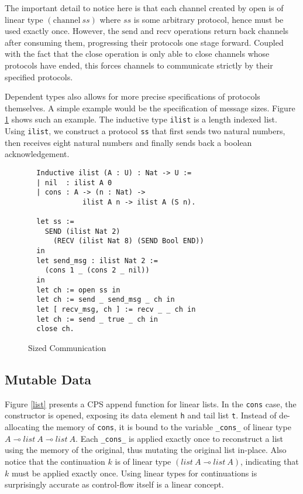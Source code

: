 \documentclass[sigplan,screen,review,authordraft]{acmart}
\newcommand{\channel}{\text{channel}}
\newcommand{\open}{\text{open}}
\newcommand{\close}{\text{close}}
\newcommand{\send}{\text{send}}
\newcommand{\recv}{\text{recv}}
\begin{document}
The important detail to notice here is that each channel created by $\open$ is of linear type $(\channel\ ss)$ where $ss$ is some arbitrary protocol, hence must be used exactly once. However, the $\send$ and $\recv$ operations return back channels after consuming them, progressing their protocols one stage forward. Coupled with the fact that the $\close$ operation is only able to close channels whose protocols have ended, this forces channels to communicate strictly by their specified protocols.

Dependent types also allows for more precise specifications of protocols themselves. A simple example would be the specification of message sizes. Figure \ref{communication} shows such an example. The inductive type \texttt{ilist} is a length indexed list. Using \texttt{ilist}, we construct a protocol \texttt{ss} that first sends two natural numbers, then receives eight natural numbers and finally sends back a boolean acknowledgement.

\begin{figure}[h]
  \caption{Sized Communication}
  \begin{verbatim}
  Inductive ilist (A : U) : Nat -> U :=
  | nil  : ilist A 0
  | cons : A -> (n : Nat) -> 
             ilist A n -> ilist A (S n).

  let ss := 
    SEND (ilist Nat 2) 
      (RECV (ilist Nat 8) (SEND Bool END)) 
  in
  let send_msg : ilist Nat 2 := 
    (cons 1 _ (cons 2 _ nil)) 
  in
  let ch := open ss in
  let ch := send _ send_msg _ ch in
  let [ recv_msg, ch ] := recv _ _ ch in
  let ch := send _ true _ ch in
  close ch.            
  \end{verbatim}
  \label{communication}
  \Description{}
\end{figure}

\subsection{Mutable Data}
Figure \ref{list} presents a CPS append function for linear lists. In the \texttt{cons} case, the constructor is opened, exposing its data element \texttt{h} and tail list \texttt{t}. Instead of de-allocating the memory of \texttt{cons}, it is bound to the variable \texttt{_cons_} of linear type $A \multimap list\ A \multimap list\ A$. Each \texttt{_cons_} is applied exactly once to reconstruct a list using the memory of the original, thus mutating the original list in-place. Also notice that the continuation $k$ is of linear type $(list\ A \multimap list\ A)$, indicating that $k$ must be applied exactly once. Using linear types for continuations is surprisingly accurate as control-flow itself is a linear concept.
\end{document}
